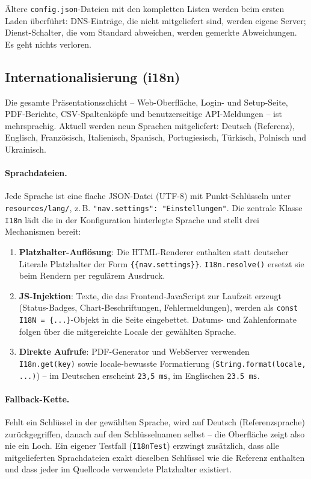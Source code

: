 Ältere \texttt{config.json}-Dateien mit den kompletten Listen werden beim ersten Laden
überführt: DNS-Einträge, die nicht mitgeliefert sind, werden eigene Server; Dienst-Schalter,
die vom Standard abweichen, werden gemerkte Abweichungen. Es geht nichts verloren.

\subsection{Internationalisierung (i18n)}
\label{subsec:i18n}

Die gesamte Präsentationsschicht -- Web-Oberfläche, Login- und Setup-Seite,
PDF-Berichte, CSV-Spaltenköpfe und benutzerseitige API-Meldungen -- ist
mehrsprachig. Aktuell werden neun Sprachen mitgeliefert: Deutsch (Referenz),
Englisch, Französisch, Italienisch, Spanisch, Portugiesisch, Türkisch, Polnisch
und Ukrainisch.

\paragraph{Sprachdateien.} Jede Sprache ist eine flache JSON-Datei (UTF-8) mit
Punkt-Schlüsseln unter \texttt{resources/lang/}, z.\,B.
\texttt{"nav.settings": "Einstellungen"}. Die zentrale Klasse \texttt{I18n}
lädt die in der Konfiguration hinterlegte Sprache und stellt drei Mechanismen
bereit:

\begin{enumerate}
  \item \textbf{Platzhalter-Auflösung}: Die HTML-Renderer enthalten statt
    deutscher Literale Platzhalter der Form \texttt{\{\{nav.settings\}\}}.
    \texttt{I18n.resolve()} ersetzt sie beim Rendern per regulärem Ausdruck.
  \item \textbf{JS-Injektion}: Texte, die das Frontend-JavaScript zur Laufzeit
    erzeugt (Status-Badges, Chart-Beschriftungen, Fehlermeldungen), werden als
    \texttt{const I18N = \{...\}}-Objekt in die Seite eingebettet. Datums- und
    Zahlenformate folgen über die mitgereichte Locale der gewählten Sprache.
  \item \textbf{Direkte Aufrufe}: PDF-Generator und WebServer verwenden
    \texttt{I18n.get(key)} sowie locale-bewusste Formatierung
    (\texttt{String.format(locale, ...)}) -- im Deutschen erscheint
    \texttt{23,5 ms}, im Englischen \texttt{23.5 ms}.
\end{enumerate}

\paragraph{Fallback-Kette.} Fehlt ein Schlüssel in der gewählten Sprache, wird
auf Deutsch (Referenzsprache) zurückgegriffen, danach auf den Schlüsselnamen
selbst -- die Oberfläche zeigt also nie ein Loch. Ein eigener Testfall
(\texttt{I18nTest}) erzwingt zusätzlich, dass alle mitgelieferten Sprachdateien
exakt dieselben Schlüssel wie die Referenz enthalten und dass jeder im
Quellcode verwendete Platzhalter existiert.

